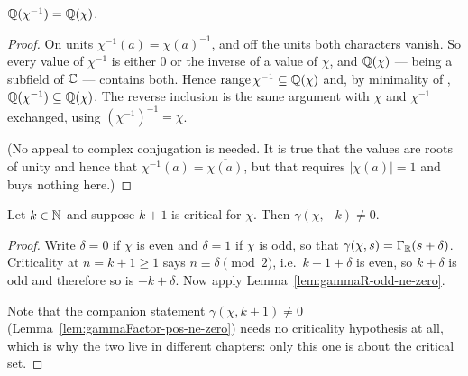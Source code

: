 \begin{lemma}
  \label{lem:valueField-inv}
  \leanok
  $\mathbb{Q}(\chi^{-1}) = \mathbb{Q}(\chi)$.
\end{lemma}
\begin{proof}
  \leanok
  On units $\chi^{-1}(a) = \chi(a)^{-1}$, and off the units both characters vanish. So
  every value of $\chi^{-1}$ is either $0$ or the inverse of a value of $\chi$, and
  $\mathbb{Q}(\chi)$ --- being a subfield of $\mathbb{C}$ --- contains both. Hence
  $\operatorname{range}\chi^{-1} \subseteq \mathbb{Q}(\chi)$ and, by minimality of
  , $\mathbb{Q}(\chi^{-1}) \subseteq \mathbb{Q}(\chi)$. The reverse inclusion is
  the same argument with $\chi$ and $\chi^{-1}$ exchanged, using $(\chi^{-1})^{-1} = \chi$.

  (No appeal to complex conjugation is needed. It is true that the values are roots of
  unity and hence that $\chi^{-1}(a) = \overline{\chi(a)}$, but that requires
  $|\chi(a)| = 1$ and buys nothing here.)
\end{proof}

\begin{lemma}
  \label{lem:gamma-ne-zero}
  \leanok
  Let $k \in \mathbb{N}$ and suppose $k+1$ is critical for $\chi$. Then $\gamma(\chi, -k) \neq 0$.
\end{lemma}
\begin{proof}
  \leanok
  Write $\delta = 0$ if $\chi$ is even and $\delta = 1$ if $\chi$ is odd, so that
  $\gamma(\chi,s) = \Gamma_{\mathbb{R}}(s+\delta)$. Criticality at $n = k+1 \geq 1$ says
  $n \equiv \delta \pmod 2$, i.e.\ $k+1+\delta$ is even, so $k+\delta$ is odd and therefore
  so is $-k+\delta$. Now apply Lemma~\ref{lem:gammaR-odd-ne-zero}.

  Note that the companion statement $\gamma(\chi,k+1) \neq 0$
  (Lemma~\ref{lem:gammaFactor-pos-ne-zero}) needs no criticality hypothesis at all, which is
  why the two live in different chapters: only this one is about the critical set.
\end{proof}


